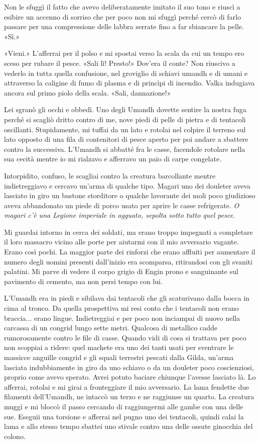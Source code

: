 Non le sfuggì il fatto che avevo deliberatamente imitato il suo tono e
riuscì a esibire un accenno di sorriso che per poco non mi sfuggì perché
cercò di farlo passare per una compressione delle labbra serrate fino a
far sbiancare la pelle. «Sì.»

«Vieni.» L'afferrai per il polso e mi spostai verso la scala da cui un
tempo ero sceso per rubare il pesce. «Sali lì! Presto!» Dov'era il
conte? Non riuscivo a vederlo in tutta quella confusione, nel
{groviglio} di schiavi umandh e di umani e attraverso la caligine di
fumo di plasma e di princìpi di incendio. Valka indugiava ancora sul
primo piolo della scala. «Sali, dannazione!»

Lei sgranò gli occhi e obbedì. Uno degli Umandh dovette sentire la
nostra fuga perché si scagliò dritto contro di me, nove piedi di pelle
di pietra e di tentacoli oscillanti. Stupidamente, mi tuffai da un lato
e rotolai nel colpire il terreno sul lato opposto di una fila di
contenitori di pesce aperto per poi andare a sbattere contro la
successiva. L'Umandh si abbatté fra le casse, facendole rotolare nella
sua cecità mentre io mi rialzavo e afferravo un paio di carpe congelate.

Intorpidito, confuso, le scagliai contro la creatura barcollante mentre
indietreggiavo e cercavo un'arma di qualche tipo. Magari uno dei
douleter aveva lasciato in giro un bastone storditore o qualche
lavorante dei moli poco giudizioso aveva abbandonato un piede di porco
usato per aprire le casse refrigerate. \emph{O magari c'è una Legione
	imperiale in agguato, sepolta sotto tutto quel pesce}.

Mi guardai intorno in cerca dei soldati, ma erano troppo impegnati a
completare il loro massacro vicino alle porte per aiutarmi con il mio
avversario vagante. Erano così pochi. La maggior parte dei rinforzi che
erano affluiti per aumentare il numero degli uomini presenti dall'inizio
era scomparsa, ritirandosi con gli svaniti palatini. Mi parve di vedere
il corpo grigio di Engin prono e sanguinante sul pavimento di cemento,
ma non persi tempo con lui.

L'Umandh era in piedi e sibilava dai tentacoli che gli scaturivano dalla
bocca in cima al tronco. Da quella prospettiva mi resi conto che i
tentacoli non erano braccia... erano lingue. Indietreggiai e per poco
non inciampai di nuovo nella carcassa di un congrid lungo sette metri.
Qualcosa di metallico cadde rumorosamente contro le file di casse.
Quando vidi di cosa si trattava per poco non scoppiai a ridere: quel
machete era uno dei tanti usati per sventrare le massicce anguille
congrid e gli squali terrestri pescati dalla Gilda, un'arma lasciata
indubbiamente in giro da uno schiavo o da un douleter poco coscienziosi,
proprio come avevo sperato. Avrei potuto baciare chiunque l'avesse
lasciato là. Lo afferrai, rotolai e mi girai a fronteggiare il mio
avversario. La lama fendette due filamenti dell'Umandh, ne intaccò un
terzo e ne raggiunse un quarto. La creatura muggì e mi bloccò il passo
cercando di raggiungermi alle gambe con una delle sue. Eseguii una
torsione e afferrai nel pugno uno dei tentacoli, quindi calai la lama e
allo stesso tempo sbattei uno stivale contro una delle ossute ginocchia
del colono.

